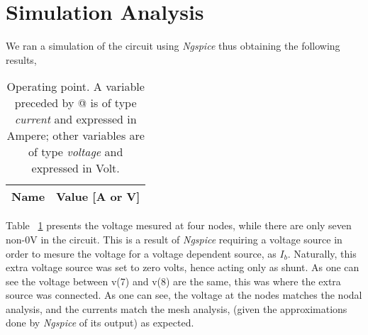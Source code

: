 \section{Simulation Analysis}

\label{sec:simulation}
We ran a simulation of the circuit using {\it Ngspice} thus obtaining the following results, 

\begin{table}[h]
\scriptsize
  \centering
  \begin{tabular}{|l|r|}
    \hline    
    {\bf Name} & {\bf Value [A or V]} \\ \hline
    
  \end{tabular}
  \caption{\scriptsize Operating point. A variable preceded by @ is of type {\em current}
    and expressed in Ampere; other variables are of type {\it voltage} and expressed in
    Volt.}
  \label{tab:op}
\end{table}
Table ~\ref{tab:op} presents the voltage mesured at four nodes, while there are only seven non-0V in the circuit. This is a result of {\it Ngspice} requiring a voltage source in order to mesure the voltage for a voltage dependent source, as $I_b$. Naturally, this extra voltage source was set to zero volts, hence acting only as shunt. As one can see the voltage between v(7) and v(8) are the same, this was where the extra source was connected. 
As one can see, the voltage at the nodes matches the nodal analysis, and the currents match the mesh analysis, (given the approximations done by {\it Ngspice} of its output) as expected. 





